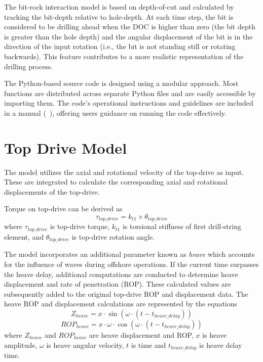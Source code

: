 The bit-rock interaction model is based on depth-of-cut and calculated by tracking the bit-depth relative to hole-depth. At each time step, the bit is considered to be drilling ahead when the DOC is higher than zero (the bit depth is greater than the hole depth) and the angular displacement of the bit is in the direction of the input rotation (i.e., the bit is not standing still or rotating backwards).  This feature contributes to a more realistic representation of the drilling process.

The Python-based source code is designed using a modular approach.  Most functions are distributed across separate Python files and are easily accessible by importing them. The code's operational instructions and guidelines are included in a manual (~\cite{ref:dixit2021a}), offering users guidance on running the code effectively.

\section{Top Drive Model}
The model utilizes the axial and rotational velocity of the top-drive as input. These are integrated to calculate the corresponding axial and rotational displacements of the top-drive.

Torque on top-drive can be derived as
\begin{equation}\label{TorqueEQ}
  \tau_{top\_drive} = k_{t1} \times \theta_{top\_drive}
\end{equation}
where $\tau_{top\_drive}$ is top-drive torque, $k_{t1}$ is torsional stiffness of first drill-string element, and $\theta_{top\_drive}$ is top-drive rotation angle. 

The model incorporates an additional parameter known as \emph{heave} which accounts for the influence of waves during offshore operations. If the current time surpasses the heave delay, additional computations are conducted to determine heave displacement and rate of penetration (ROP). These calculated values are subsequently added to the original top-drive ROP and displacement data. The heave ROP and displacement calculations are represented by the equations
\begin{equation}\label{Z_heave}
  Z_{heave} = x \cdot \sin(\omega \cdot (t - t_{heave\_delay}))
\end{equation}
\begin{equation}\label{ROP_heave}
  ROP_{heave} = x \cdot \omega \cdot \cos(\omega \cdot (t - t_{heave\_delay}))
\end{equation}
where 
$Z_{heave}$ and $ROP_{heave}$ are heave displacement and ROP, $x$ is heave amplitude, $\omega$ is heave angular velocity, $t$ is time and $t_{heave\_delay}$ is heave delay time.
 
